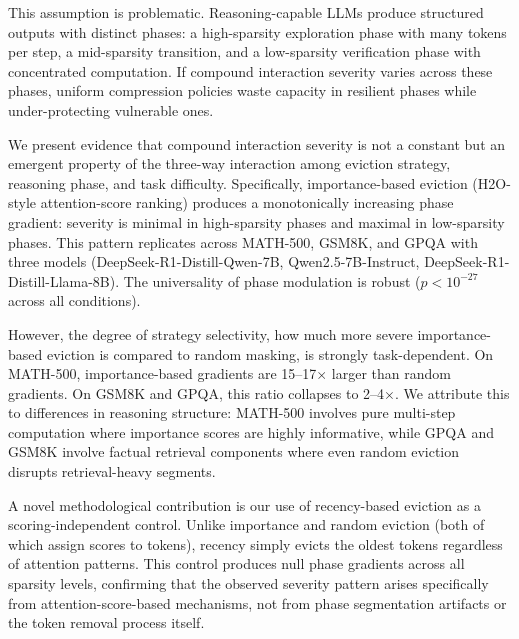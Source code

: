 \documentclass[11pt,a4paper]{article}
\begin{document}
This assumption is problematic. Reasoning-capable LLMs produce structured outputs with distinct phases: a high-sparsity exploration phase with many tokens per step, a mid-sparsity transition, and a low-sparsity verification phase with concentrated computation. If compound interaction severity varies across these phases, uniform compression policies waste capacity in resilient phases while under-protecting vulnerable ones.

We present evidence that compound interaction severity is not a constant but an emergent property of the three-way interaction among eviction strategy, reasoning phase, and task difficulty. Specifically, importance-based eviction (H2O-style attention-score ranking) produces a monotonically increasing phase gradient: severity is minimal in high-sparsity phases and maximal in low-sparsity phases. This pattern replicates across MATH-500, GSM8K, and GPQA with three models (DeepSeek-R1-Distill-Qwen-7B, Qwen2.5-7B-Instruct, DeepSeek-R1-Distill-Llama-8B). The universality of phase modulation is robust ($p < 10^{-27}$ across all conditions).

However, the degree of strategy selectivity, how much more severe importance-based eviction is compared to random masking, is strongly task-dependent. On MATH-500, importance-based gradients are 15--17$\times$ larger than random gradients. On GSM8K and GPQA, this ratio collapses to 2--4$\times$. We attribute this to differences in reasoning structure: MATH-500 involves pure multi-step computation where importance scores are highly informative, while GPQA and GSM8K involve factual retrieval components where even random eviction disrupts retrieval-heavy segments.

A novel methodological contribution is our use of recency-based eviction as a scoring-independent control. Unlike importance and random eviction (both of which assign scores to tokens), recency simply evicts the oldest tokens regardless of attention patterns. This control produces null phase gradients across all sparsity levels, confirming that the observed severity pattern arises specifically from attention-score-based mechanisms, not from phase segmentation artifacts or the token removal process itself.
\end{document}
